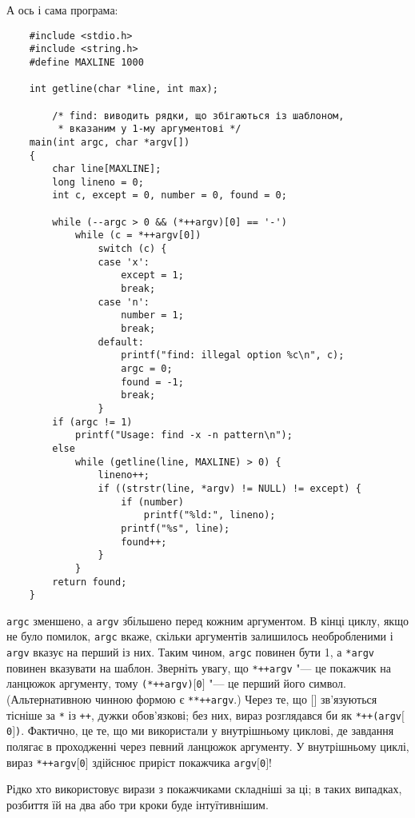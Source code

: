 \documentclass[a4paper,12pt]{book}
\begin{document}
  А ось і сама програма:
  \begin{verbatim}
    #include <stdio.h>
    #include <string.h>
    #define MAXLINE 1000

    int getline(char *line, int max);

        /* find: виводить рядки, що збігаються із шаблоном,
         * вказаним у 1-му аргументові */
    main(int argc, char *argv[])
    {
        char line[MAXLINE];
        long lineno = 0;
        int c, except = 0, number = 0, found = 0;

        while (--argc > 0 && (*++argv)[0] == '-')
            while (c = *++argv[0])
                switch (c) {
                case 'x':
                    except = 1;
                    break;
                case 'n':
                    number = 1;
                    break;
                default:
                    printf("find: illegal option %c\n", c);
                    argc = 0;
                    found = -1;
                    break;
                }
        if (argc != 1)
            printf("Usage: find -x -n pattern\n");
        else
            while (getline(line, MAXLINE) > 0) {
                lineno++;
                if ((strstr(line, *argv) != NULL) != except) {
                    if (number)
                        printf("%ld:", lineno);
                    printf("%s", line);
                    found++;
                }
            }
        return found;
    }
  \end{verbatim}

  \texttt{argc} зменшено, а \texttt{argv} збільшено перед кожним аргументом. В кінці
  циклу, якщо не було помилок, \texttt{argc} вкаже, скільки аргументів залишилось
  необробленими і \texttt{argv} вказує на перший із них. Таким чином, \texttt{argc}
  повинен бути 1, а \texttt{*argv} повинен вказувати на шаблон. Зверніть увагу, що
  \texttt{*++argv} "--- це покажчик на ланцюжок аргументу, тому
  \texttt{(*++argv)\mbox{$[$}0\mbox{$]$}} "--- це перший його символ. (Альтернативною
  чинною формою є \texttt{**++argv}.) Через те, що \texttt{\mbox{$[$}\mbox{$]$}}
  зв'язуються тісніше за \texttt{*} із \texttt{++}, дужки обов'язкові; без них, вираз
  розглядався би як \texttt{*++(argv\mbox{$[$}0\mbox{$]$})}. Фактично, це те, що ми
  використали у внутрішньому циклові, де завдання полягає в проходженні через певний
  ланцюжок аргументу. У внутрішньому циклі, вираз \texttt{*++argv\mbox{$[$}0\mbox{$]$}}
  здійснює приріст покажчика \texttt{argv\mbox{$[$}0\mbox{$]$}}!

  Рідко хто використовує вирази з покажчиками складніші за ці; в таких випадках,
  розбиття їй на два або три кроки буде інтуїтивнішим.
\end{document}
